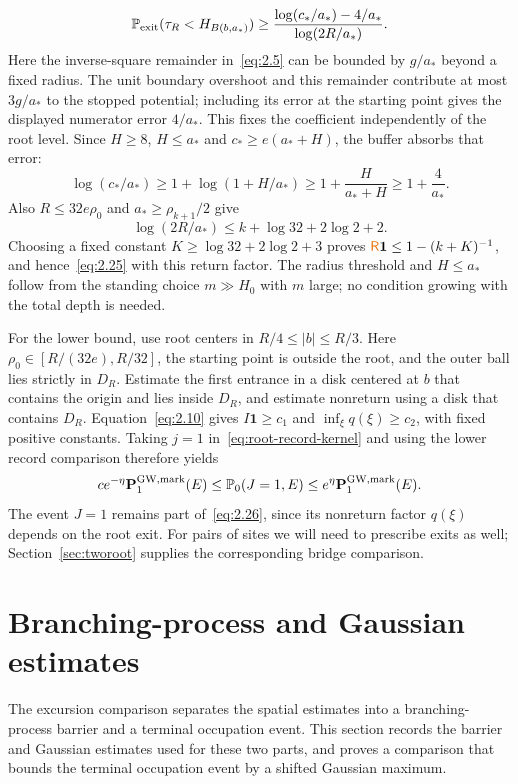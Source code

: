 \documentclass[11pt,letterpaper,reqno]{amsart}
\newif\ifrevmarks \revmarkstrue
\newcommand{\add}[1]{\ifrevmarks\textcolor{revorange}{#1}\else#1\fi}
\newcommand{\ren}[2]{\add{#2}}%
\numberwithin{equation}{section}
\theoremstyle{remark}
\begin{document}
\[
\mathbb P_{\rm exit}(\tau_R<H_{B(b,a_*)})
\ge\frac{\log(c_*/a_*)-4/a_*}{\log(2R/a_*)}.
\]
Here the inverse-square remainder in~\eqref{eq:2.5} can be bounded by $g/a_*$ beyond a fixed radius. The unit boundary overshoot and this remainder contribute at most $3g/a_*$ to the stopped potential; including its error at the starting point gives the displayed numerator error $4/a_*$. This fixes the coefficient independently of the root level.
Since $H\ge8$, $H\le a_*$ and $c_*\ge e(a_*+H)$, the buffer absorbs that error:
\[
\log(c_*/a_*)\ge1+\log(1+H/a_*)
\ge1+\frac{H}{a_*+H}\ge1+\frac4{a_*}.
\]
Also $R\le32e\rho_0$ and $a_*\ge\rho_{k+1}/2$ give
\[
\log(2R/a_*)\le k+\log32+2\log2+2.
\]
Choosing a fixed constant $K\ge\log32+2\log2+3$ proves $\ren{R}{\mathsf R}\mathbf1\le1-(k+K)^{-1}$, and hence~\eqref{eq:2.25} with this return factor. The radius threshold and $H\le a_*$ follow from the standing choice $m\gg H_0$ with $m$ large; no condition growing with the total depth is needed.

For the lower bound, use root centers in $R/4\le|b|\le R/3$. Here $\rho_0\in[R/(32e),R/32]$, the starting point is outside the root, and the outer ball lies strictly in $D_R$. Estimate the first entrance in a disk centered at $b$ that contains the origin and lies inside $D_R$, and estimate nonreturn using a disk that contains $D_R$. Equation~\eqref{eq:2.10} gives $I\mathbf1\ge c_1$ and $\inf_\xi q(\xi)\ge c_2$, with fixed positive constants. Taking $j=1$ in~\eqref{eq:root-record-kernel} and using the lower record comparison therefore yields
\begin{equation}\label{eq:2.26}
c e^{-\eta}\mathbf P_1^{\rm GW,mark}(E)
\le\mathbb P_0(J=1,E)
\le e^\eta\mathbf P_1^{\rm GW,mark}(E).
\end{equation}
The event $J=1$ remains part of~\eqref{eq:2.26}, since its nonreturn factor $q(\xi)$ depends on the root exit. For pairs of sites we will need to prescribe exits as well; Section~\ref{sec:tworoot} supplies the corresponding bridge comparison.



\section{Branching-process and Gaussian estimates}\label{sec:tools}
The excursion comparison separates the spatial estimates into a branching-process barrier and a terminal occupation event. This section records the barrier and Gaussian estimates used for these two parts, and proves a comparison that bounds the terminal occupation event by a shifted Gaussian maximum.
\end{document}
